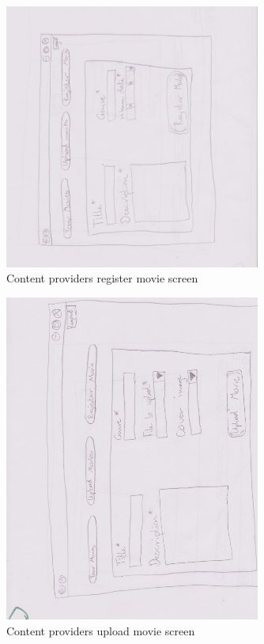 \begin{figure}[!ht]
  \centering
    \includegraphics[width=0.75\textwidth]{Parts/Appendix/Images/PaperMockup/CPRegisterMovie}
  \caption{Content providers register movie screen}
  \label{fig:Appendix_GUI_sketches_CPRegister}
\end{figure}

\clearpage

\begin{figure}[!ht]
  \centering
    \includegraphics[width=0.75\textwidth]{Parts/Appendix/Images/PaperMockup/CPUploadmovie}
  \caption{Content providers upload movie screen}
  \label{fig:Appendix_GUI_sketches_CPUploadMovie}
\end{figure}

